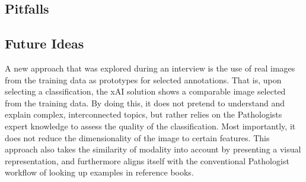 %

\subsection{Pitfalls}

\subsection{Future Ideas}
A new approach that was explored during an interview is the use of real images from the training data as prototypes for selected annotations. That is, upon selecting a classification, the xAI solution shows a comparable image selected from the training data. By doing this, it does not pretend to understand and explain complex, interconnected topics, but rather relies on the Pathologists expert knowledge to assess the quality of the classification. Most importantly, it does not reduce the dimensionality of the image to certain features.
This approach also takes the similarity of modality into account by presenting a visual representation, and furthermore aligns itself with
the conventional Pathologist workflow of looking up examples in reference books.






